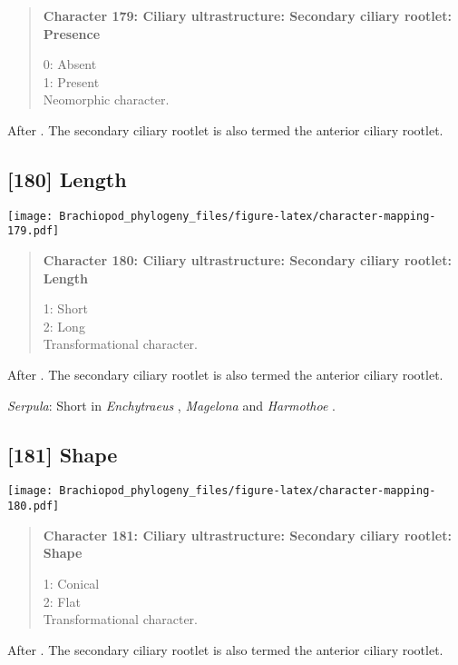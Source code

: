 \documentclass[openany]{book}
\theoremstyle{definition}
\theoremstyle{definition}
\theoremstyle{definition}
\theoremstyle{remark}
\begin{document}
\begin{quote}
\textbf{Character 179: Ciliary ultrastructure: Secondary ciliary
rootlet: Presence}

0: Absent\\
1: Present\\
Neomorphic character.
\end{quote}

After \citet{Lundin2009}. The secondary ciliary rootlet is also termed
the anterior ciliary rootlet.

\subsection*{{[}180{]} Length}\label{length-1}

\texttt{[image: Brachiopod\_phylogeny\_files/figure-latex/character-mapping-179.pdf]}

\begin{quote}
\textbf{Character 180: Ciliary ultrastructure: Secondary ciliary
rootlet: Length}

1: Short\\
2: Long\\
Transformational character.
\end{quote}

After \citet{Lundin2009}. The secondary ciliary rootlet is also termed
the anterior ciliary rootlet.

\hypertarget{Serpula-coding-180}{}
\emph{Serpula}: Short in \emph{Enchytraeus} \citep{Reger1967},
\emph{Magelona} \citep{Bartolomaeus1995} and \emph{Harmothoe}
\citep{Holborow1969}.

\subsection*{{[}181{]} Shape}\label{shape-1}

\texttt{[image: Brachiopod\_phylogeny\_files/figure-latex/character-mapping-180.pdf]}

\begin{quote}
\textbf{Character 181: Ciliary ultrastructure: Secondary ciliary
rootlet: Shape}

1: Conical\\
2: Flat\\
Transformational character.
\end{quote}

After \citet{Lundin2009}. The secondary ciliary rootlet is also termed
the anterior ciliary rootlet.
\end{document}
